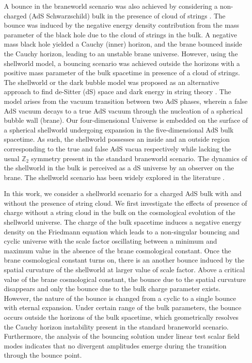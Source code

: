 \documentclass[12pt]{article}
\begin{document}
A bounce in the braneworld scenario was also achieved by considering a non-charged (AdS Schwarzschild) bulk in the presence of cloud of strings \cite{Sherpa:2026bzw}. The bounce was induced by the negative energy density contribution from the mass parameter of the black hole due to the cloud of strings in the bulk. A negative mass black hole yielded a Cauchy (inner) horizon, and the brane bounced inside the Cauchy horizon, leading to an unstable brane universe. However, using the shellworld model, a bouncing scenario was achieved outside the horizons with a positive mass parameter of the bulk spacetime in presence of a cloud of strings.  The shellworld or the dark bubble model was proposed as an alternative approach to find de-Sitter (dS) space and dark energy in string theory \cite{Banerjee:2018qey}. The model arises from the vacuum transition between two AdS phases, wherein a false AdS vacuum decays to a true AdS vacuum through the nucleation of a spherical bubble wall (brane). Our four-dimensional Universe is embedded on the surface of a spherical shellworld undergoing expansion in the five-dimensional AdS bulk spacetime. As such, the shellworld possesses an inside and an outside region corresponding to the true and false AdS vacua respectively while lacking the usual $\mathbb{Z}_2$ symmetry present in the standard braneworld scenario. The dynamics of the shellworld in the bulk is perceived as a dS universe by an observer on the brane. The shellworld scenario has been widely explored in the literature \cite{Banerjee:2019fzz,Banerjee:2020wix,Banerjee:2020wov,Banerjee:2022ree,Banerjee:2023uto}.

In this work, we consider a shellworld scenario for a charged AdS bulk with and without the presence of string cloud. We first investigate the effects of presence of charge without a string cloud in the bulk on the cosmological evolution of the shellworld universe. The charge of the bulk spacetime induces a negative energy density on the Friedmann equation which leads to a non-singular bouncing and cyclic universe with the scale factor oscillating between a minimum and maximum value in the absence of the brane cosmological constant. Once the brane cosmological constant turns on, there is an another bounce induced by the spatial curvature of the shellworld  at larger value of scale factor. Above a critical value of the brane cosmological constant, the bounce due to the spatial curvature disappears and only the bounce due to the bulk charge parameter exists. However, the nature of the bounce is changed from a cyclic to a single bounce with eternal expansion. Under certain range of the bulk parameters, the bounce occurs outside the horizons of the bulk spacetime, which geometrically resolves the Cauchy horizon instability present in the standard braneworld scenario. Furthermore, the analysis of the bouncing solution under linear test scalar field modes indicates that no divergent amplitudes emerge during the transition through the bounce point. 
\end{document}
